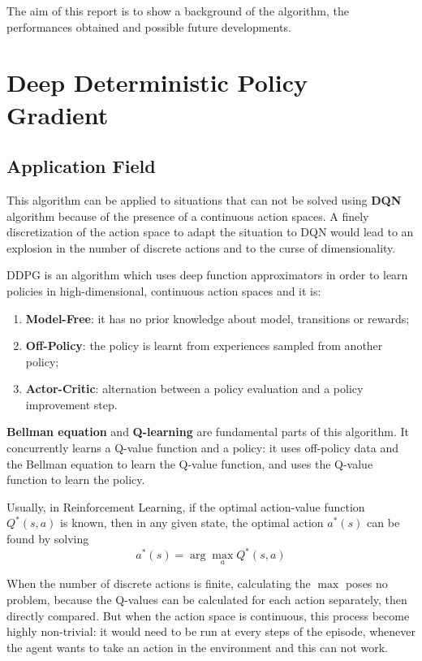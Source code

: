 \documentclass[a4paper, 11pt]{article}
\begin{document}
	The aim of this report is to show a background of the algorithm, the performances obtained and possible future developments.
	
	\section{Deep Deterministic Policy Gradient} \label{ddpg}
	\subsection{Application Field}
	This algorithm can be applied to situations that can not be solved using \textbf{DQN} algorithm \cite{mnih2015human} because of the presence of a continuous action spaces. A finely discretization of the action space to adapt the situation to DQN would lead to an explosion in the number of discrete actions and to the curse of dimensionality.
	
	DDPG is an algorithm which uses deep function approximators in order to learn policies in high-dimensional, continuous action spaces and it is:
	
	\begin{enumerate}[label={\alph*)},font={\color{black}\bfseries}, nolistsep]
		\item \textbf{Model-Free}: it has no prior knowledge about model, transitions or rewards;
		\item \textbf{Off-Policy}: the policy is learnt from experiences sampled from another policy;
		\item \textbf{Actor-Critic}: alternation between a policy evaluation and a policy improvement step.
	\end{enumerate}
	
	\textbf{Bellman equation} and \textbf{Q-learning} are fundamental parts of this algorithm.	It concurrently learns a Q-value function and a policy: it uses off-policy data and the Bellman equation to learn the Q-value function, and uses the Q-value function to learn the policy.
	
	Usually, in Reinforcement Learning, if the optimal action-value function $Q^*(s,a)$ is known, then in any given state, the optimal action $a^*(s)$ can be found by solving \[a^*(s) = \arg \max_a Q^*(s,a)\]
	
	When the number of discrete actions is finite, calculating the $\max$ poses no problem, because the Q-values can be calculated for each action separately, then directly compared. But when the action space is continuous, this process become highly non-trivial: it would need to be run at every steps of the episode, whenever the agent wants to take an action in the environment and this can not work.
	
\end{document}
